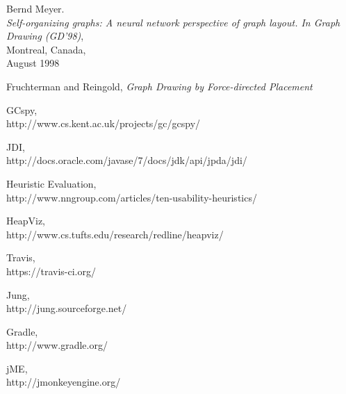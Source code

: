 \documentclass[11pt, a4paper]{report}
\begin{document}
\begin{thebibliography}{9}

  Bernd Meyer. 
  \\ \emph{Self-organizing graphs: A neural network perspective of graph layout. In Graph Drawing (GD'98)}, 
  \\Montreal, Canada, 
  \\August 1998

  Fruchterman and Reingold, 
  \emph{Graph Drawing by Force-directed Placement}
 
  GCspy,
  \\http://www.cs.kent.ac.uk/projects/gc/gcspy/

  JDI, 
  \\http://docs.oracle.com/javase/7/docs/jdk/api/jpda/jdi/

  Heuristic Evaluation,
  \\http://www.nngroup.com/articles/ten-usability-heuristics/
  
  HeapViz,
  \\http://www.cs.tufts.edu/research/redline/heapviz/

  Travis,
  \\https://travis-ci.org/

  Jung,
  \\http://jung.sourceforge.net/

  Gradle,
  \\http://www.gradle.org/

  jME,
  \\http://jmonkeyengine.org/

\end{thebibliography}
\end{document}
